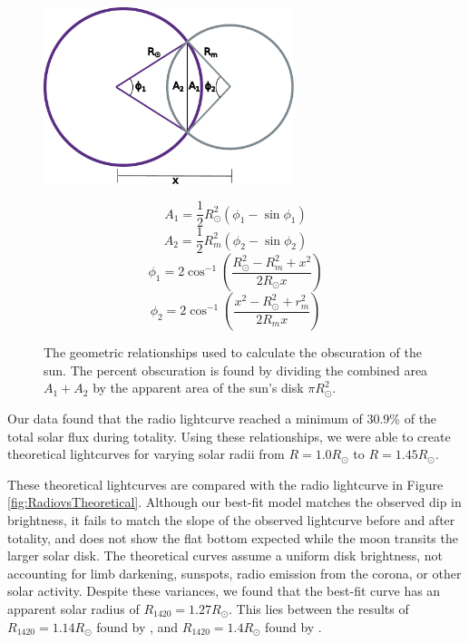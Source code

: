 \begin{figure}
\begin{minipage}{0.49\textwidth}
  \includegraphics[width=0.65\textwidth]{figures/Figure2.pdf}
  \caption{\label{fig:eclipse_geometry} The geometric relationships used to calculate the obscuration of the sun. The percent obscuration is found by dividing the combined area $A_1 + A_2$ by the apparent area of the sun's disk $\pi R_\odot^2$.}
\end{minipage}
\hfill
\begin{minipage}{0.49\textwidth}
\begin{equation}\label{eq:geometry_1}
  A_1 = \frac{1}{2}R_{\odot}^2\left(\phi_1 - \sin\phi_1\right)
\end{equation}
\begin{equation}\label{eq:geometry_2}
  A_2 = \frac{1}{2}R_{m}^2\left(\phi_2 - \sin\phi_2\right)
\end{equation}
\begin{equation}\label{eq:geometry_3}
  \phi_1 = 2\cos^{-1}\left(\frac{R_{\odot}^2 - R_{m}^2+x^2}{2R_{\odot}x}\right)
\end{equation}
\begin{equation}\label{eq:geometry_4}
  \phi_2 = 2\cos^{-1}\left(\frac{x^2 - R_{\odot}^2 + r_{m}^2}{2R_{m}x}\right)
\end{equation}
\end{minipage}
\end{figure}

Our data found that the radio lightcurve reached a minimum of 30.9\% of the total solar flux during totality.
Using these relationships, we were able to create theoretical lightcurves for varying solar radii from $R = 1.0 R_{\odot}$ to $R = 1.45 R_{\odot}$.

These theoretical lightcurves are compared with the radio lightcurve in Figure \ref{fig:RadiovsTheoretical}.
Although our best-fit model matches the observed dip in brightness, it fails to match the slope of the observed lightcurve before and after totality, and does not show the flat bottom expected while the moon transits the larger solar disk.
The theoretical curves assume a uniform disk brightness, not accounting for limb darkening, sunspots, radio emission from the corona, or other solar activity.
Despite these variances, we found that the best-fit curve has an apparent solar radius of $R_{\mathrm{1420}} = 1.27 R_{\odot}$.
This lies between the results of $R_{\mathrm{1420}} = 1.14 R_{\odot}$ found by \cite{messerotti_radio_2000}, and $R_{\mathrm{1420}} = 1.4 R_{\odot}$ found by \cite{leung_solar_2022}.


